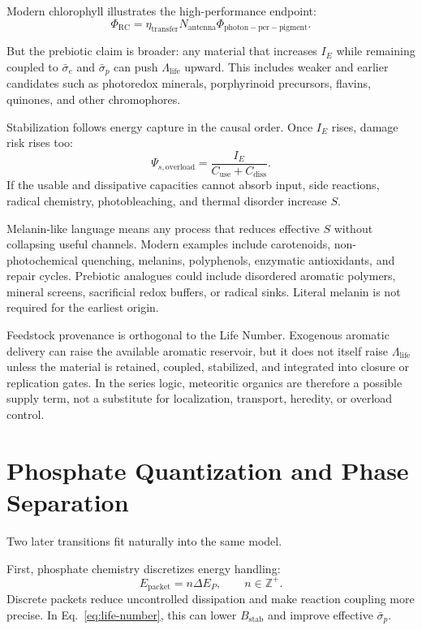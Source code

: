 \documentclass[11pt,a4paper]{article}
\begin{document}
Modern chlorophyll illustrates the high-performance endpoint:
\begin{equation}
 \Phi_{\mathrm{RC}} =
 \eta_{\mathrm{transfer}} N_{\mathrm{antenna}}
 \Phi_{\mathrm{photon-per-pigment}}.
\end{equation}

But the prebiotic claim is broader: any material that increases $I_E$ while remaining coupled to $\bar{\sigma}_e$ and $\bar{\sigma}_p$ can push $\Lambda_{\mathrm{life}}$ upward. This includes weaker and earlier candidates such as photoredox minerals, porphyrinoid precursors, flavins, quinones, and other chromophores.

Stabilization follows energy capture in the causal order. Once $I_E$ rises, damage risk rises too:
\begin{equation}
 \Psi_{s,\mathrm{overload}} =
 \frac{I_E}{C_{\mathrm{use}}+C_{\mathrm{diss}}}.
\end{equation}
If the usable and dissipative capacities cannot absorb input, side reactions, radical chemistry, photobleaching, and thermal disorder increase $S$.

Melanin-like language means any process that reduces effective $S$ without collapsing useful channels. Modern examples include carotenoids, non-photochemical quenching, melanins, polyphenols, enzymatic antioxidants, and repair cycles. Prebiotic analogues could include disordered aromatic polymers, mineral screens, sacrificial redox buffers, or radical sinks. Literal melanin is not required for the earliest origin.

Feedstock provenance is orthogonal to the Life Number. Exogenous aromatic delivery can raise the available aromatic reservoir, but it does not itself raise $\Lambda_{\mathrm{life}}$ unless the material is retained, coupled, stabilized, and integrated into closure or replication gates. In the series logic, meteoritic organics are therefore a possible supply term, not a substitute for localization, transport, heredity, or overload control.

\section{Phosphate Quantization and Phase Separation}

Two later transitions fit naturally into the same model.

First, phosphate chemistry discretizes energy handling:
\begin{equation}
 E_{\mathrm{packet}} = n\Delta E_P,\qquad n\in\mathbb{Z}^{+}.
\end{equation}
Discrete packets reduce uncontrolled dissipation and make reaction coupling more precise. In Eq.~\eqref{eq:life-number}, this can lower $B_{\mathrm{stab}}$ and improve effective $\bar{\sigma}_p$.
\end{document}

